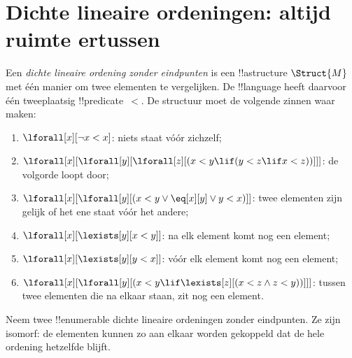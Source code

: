 \documentclass[../../../include/open-logic-section]{subfiles}
\begin{document}
\section{Dichte lineaire ordeningen: altijd ruimte ertussen}

\begin{defn}
  Een \emph{dichte lineaire ordening zonder eindpunten} is een !!a{structure}
  $\Struct{M}$ met één manier om twee elementen te vergelijken. De
  !!{language} heeft daarvoor één tweeplaatsig !!{predicate}~$<$. De
  structuur moet de volgende zinnen waar maken:
  \begin{enumerate}
  \item $\lforall[x][\lnot x < x]$: niets staat vóór zichzelf;
  \item $\lforall[x][\lforall[y][\lforall[z][(x < y \lif (y < z \lif x
    <z ))]]]$: de volgorde loopt door;
  \item $\lforall[x][\lforall[y][(x< y \lor \eq[x][y] \lor y < x)]]$:
    twee elementen zijn gelijk of het ene staat vóór het andere;
  \item $\lforall[x][\lexists[y][x < y]]$: na elk element komt nog een element;
  \item $\lforall[x][\lexists[y][y < x]]$: vóór elk element komt nog een element;
  \item $\lforall[x][\lforall[y][(x < y \lif \lexists[z][(x < z \land
        z < y))]]]$: tussen twee elementen die na elkaar staan, zit nog een element.
 \end{enumerate}
\end{defn}

\begin{thm}
  Neem twee !!{enumerable} dichte lineaire ordeningen zonder
  eindpunten. Ze zijn isomorf: de elementen kunnen zo aan elkaar worden
  gekoppeld dat de hele ordening hetzelfde blijft.
\end{thm}
\end{document}
